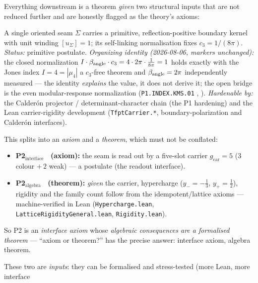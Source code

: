 \documentclass[11pt,a4paper]{article}
\newcommand{\gcar}{g_{\mathrm{car}}}
\newcommand{\cthree}{c_3}
\theoremstyle{definition}
\begin{document}
\begin{keybox}
Everything downstream is a theorem \emph{given} two structural inputs that are not reduced further and
are honestly flagged as the theory's axioms:
\begin{description}[leftmargin=2.2em,style=nextline]
  \item[\textnormal{(P1) Boundary kernel.}] A single oriented seam $\Sigma$ carries a primitive,
  reflection-positive boundary kernel with unit winding $[u_\Sigma]=1$; its self-linking normalisation
  fixes $\cthree=1/(8\pi)$. \emph{Status:} primitive postulate. \emph{Organizing identity (2026-08-06,
  markers unchanged):} the closed normalization $I\cdot\beta_{\rm angle}\cdot\cthree=4\cdot2\pi\cdot
  \tfrac1{8\pi}=1$ holds exactly with the Jones index $I=4=|\mu_4|$ a $\cthree$-free theorem and
  $\beta_{\rm angle}=2\pi$ independently measured --- the identity \emph{explains} the value, it does
  not derive it; the open bridge is the even modular-response normalization
  (\texttt{P1.INDEX.KMS.01} \mO, ). \emph{Hardenable by:} the Calder\'on
  projector / determinant-character chain (the P1 hardening) and the Lean carrier-rigidity development
  (\texttt{TfptCarrier.*}, boundary-polarization and Calder\'on interfaces).
  \item[\textnormal{(P2) Carrier interface.}] This splits into an \emph{axiom} and a \emph{theorem},
  which must not be conflated:
  \begin{itemize}\setlength\itemsep{1pt}
  \item \textbf{P2$_{\mathrm{interface}}$ \mO\ (axiom):} the seam is read out by a five-slot carrier
  $\gcar=5$ ($3$ colour $+\,2$ weak) --- a postulate (the readout interface).
  \item \textbf{P2$_{\mathrm{algebra}}$ \mE\ (theorem):} \emph{given} the carrier, hypercharge
  ($y_-=-\tfrac13$, $y_+=\tfrac12$), rigidity and the family count follow from the idempotent/lattice
  axioms --- machine-verified in Lean (\texttt{Hypercharge.lean}, \texttt{LatticeRigidityGeneral.lean},
  \texttt{Rigidity.lean}).
  \end{itemize}
  So P2 is an \emph{interface axiom} whose \emph{algebraic consequences are a formalised theorem} ---
  ``axiom or theorem?'' has the precise answer: interface axiom, algebra theorem.
\end{description}
These two are \emph{inputs}: they can be formalised and stress-tested (more Lean, more interface

\end{keybox}
\end{document}
